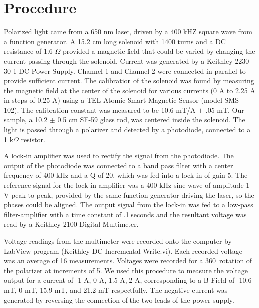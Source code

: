 \documentclass[prb,preprint]{revtex4-1}
\begin{document}
\section{Procedure}
{Polarized light came from a 650 nm laser, driven by a 400 kHZ square wave from a function generator. A 15.2 cm long solenoid with 1400 turns and a DC resistance of 1.6 $\Omega$ provided a magnetic field that could be varied by changing the current passing through the solenoid. Current was generated by a Keithley 2230-30-1 DC Power Supply.  Channel 1 and Channel 2 were connected in parallel to provide sufficient current. The calibration of the solenoid was found by measuring the magnetic field at the center of the solenoid for various currents (0 A to 2.25 A in steps of 0.25 A) using a TEL-Atomic Smart Magnetic Sensor (model SMS 102).   The calibration constant was measured to be 10.6 mT/A $\pm$ .05 mT. Our sample, a 10.2 $\pm$ 0.5 cm SF-59 glass rod, was centered inside the solenoid. The light is passed through a polarizer and detected by a photodiode, connected to a 1 k$\Omega$ resistor.

A lock-in amplifier was used to rectify the signal from the photodiode.  The output of the photodiode was connected to a band pass filter with a center frequency of 400 kHz and a Q of 20, which was fed into a lock-in of gain 5.  The reference signal for the lock-in amplifier was a 400 kHz sine wave of amplitude 1 V peak-to-peak, provided by the same function generator driving the laser, so the phases could be aligned.  The output signal from the lock-in was fed to a low-pass filter-amplifier with a time constant of .1 seconds and the resultant voltage was read by a Keithley 2100 Digital Multimeter.

Voltage readings from the multimeter were recorded onto the computer by LabView program (Keithley DC Incremental Write.vi). Each recorded voltage was an average of 16 measurements. Voltages were recorded for a 360\degree\ rotation of the polarizer at increments of 5\degree. We used this procedure to measure the voltage output for a current of -1 A, 0 A, 1.5 A, 2 A, corresponding to a B Field of -10.6 mT, 0 mT, 15.9 mT, and 21.2 mT respectfully. The negative current was generated by reversing the connection of the two leads of the power supply.

}
\end{document}

